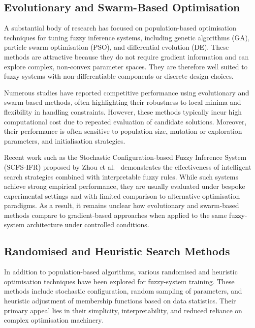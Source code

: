 \documentclass[a4paper,12pt,oneside]{article}
\begin{document}
\subsection{Evolutionary and Swarm-Based Optimisation}

A substantial body of research has focused on population-based optimisation techniques for tuning fuzzy inference systems, including genetic algorithms (GA), particle swarm optimisation (PSO), and differential evolution (DE). These methods are attractive because they do not require gradient information and can explore complex, non-convex parameter spaces. They are therefore well suited to fuzzy systems with non-differentiable components or discrete design choices.

Numerous studies have reported competitive performance using evolutionary and swarm-based methods, often highlighting their robustness to local minima and flexibility in handling constraints. However, these methods typically incur high computational cost due to repeated evaluation of candidate solutions. Moreover, their performance is often sensitive to population size, mutation or exploration parameters, and initialisation strategies.

Recent work such as the Stochastic Configuration-based Fuzzy Inference System (SCFS-IFR) proposed by Zhou et al.~\cite{zhou2023stochastic} demonstrates the effectiveness of intelligent search strategies combined with interpretable fuzzy rules. While such systems achieve strong empirical performance, they are usually evaluated under bespoke experimental settings and with limited comparison to alternative optimisation paradigms. As a result, it remains unclear how evolutionary and swarm-based methods compare to gradient-based approaches when applied to the same fuzzy-system architecture under controlled conditions.

\subsection{Randomised and Heuristic Search Methods}

In addition to population-based algorithms, various randomised and heuristic optimisation techniques have been explored for fuzzy-system training. These methods include stochastic configuration, random sampling of parameters, and heuristic adjustment of membership functions based on data statistics. Their primary appeal lies in their simplicity, interpretability, and reduced reliance on complex optimisation machinery.
\end{document}
